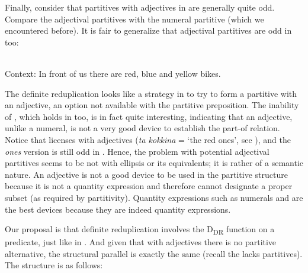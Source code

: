 \documentclass[output=paper,
modfonts
]{langscibook}
\begin{document}
Finally, consider that partitives with adjectives in  are generally quite odd. Compare the adjectival partitives with the numeral partitive (which we encountered before). It is fair to generalize that adjectival partitives are odd in  too: 

\ea\label{ex:etxeberria:49}  \\
Context: In front of us there are red, blue and yellow bikes.
\z
\z

The definite reduplication looks like a strategy in  to try to form a partitive with an adjective, an option not available with the partitive preposition. The inability of , which holds in  too, is in fact quite interesting, indicating that an adjective, unlike a numeral, is not a very good device to establish the part-of relation. Notice that  licenses  with adjectives (\textit{ta kokkina} = `the red ones', see \citealt{giannakidou-merchant1997,giannakidou-stavrou1999}), and the \textit{ones} version is still odd in . Hence, the problem with potential adjectival partitives seems to be not with ellipsis or its equivalents; it is rather of a semantic nature. An adjective is not a good device to be used in the partitive structure because it is not a quantity expression and therefore cannot designate a proper subset (as required by partitivity). Quantity expressions such as numerals and  are the best devices because they are indeed quantity expressions.

Our proposal is that definite reduplication involves the D\textsubscript{DR} function on a predicate, just like in . And given that with adjectives there is no partitive alternative, the structural parallel is exactly the same (recall the  lacks partitives). The structure is as follows:
\end{document}
